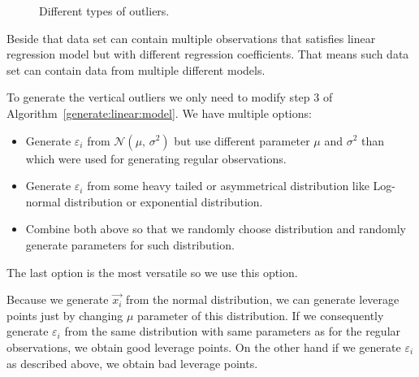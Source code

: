 \begin{figure}[h]

    \caption{Different types of outliers.  }
    \label{outliers:types:figure}
\end{figure}

Beside that data set can contain multiple observations that satisfies linear regression model but with different regression coefficients. That means such data set can contain data from multiple different models.

To generate the vertical outliers we only need to modify step $3$ of Algorithm~\ref{generate:linear:model}. We have multiple options:
\begin{itemize}
    \item Generate $\varepsilon_i$ from $\mathcal{N}(\mu,\,\sigma^{2})$ but use different parameter  $\mu$ and $\sigma^{2}$ than which were used for generating regular observations.
    \item Generate $\varepsilon_i$ from some heavy tailed or asymmetrical distribution like  Log-normal distribution or exponential distribution.
    \item Combine both above so that we randomly choose distribution and randomly generate parameters for such distribution.
\end{itemize}
The last option is the most versatile so we use this option. 

Because we generate $\vec{x_i}$ from the normal distribution, we can generate leverage points just by changing $\mu$ parameter of this distribution. If we consequently generate $\varepsilon_i$ from the same distribution with same parameters as for the regular observations, we obtain good leverage points. On the other hand if we generate $\varepsilon_i$ as described above, we obtain bad leverage points.

